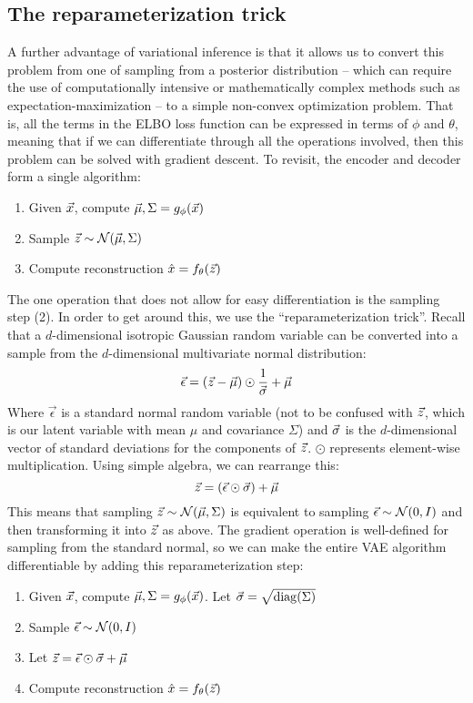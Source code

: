 \subsection{The reparameterization trick}

A further advantage of variational inference is that it allows us to convert this problem from one of sampling from a posterior distribution -- which can require the use of computationally intensive or mathematically complex methods such as expectation-maximization -- to a simple non-convex optimization problem. That is, all the terms in the ELBO loss function can be expressed in terms of $\phi$ and $\theta$, meaning that if we can differentiate through all the operations involved, then this problem can be solved with gradient descent. To revisit, the encoder and decoder form a single algorithm:
\begin{enumerate}
    \item Given $\vec{x}$, compute $\vec{\mu}, \Sigma = g_\phi(\vec{x})$
    \item Sample $\vec{z}\sim\mathcal{N}(\vec{\mu},\Sigma)$
    \item Compute reconstruction $\hat{x} = f_\theta(\vec{z})$
\end{enumerate}

The one operation that does not allow for easy differentiation is the sampling step (2). In order to get around this, we use the ``reparameterization trick''. Recall that a $d$-dimensional isotropic Gaussian random variable can be converted into a sample from the $d$-dimensional multivariate normal distribution:
\[
    \vec{\epsilon} = (\vec{z} - \vec{\mu}) \odot \frac{1}{\vec{\sigma}} + \vec{\mu}
\]
Where $\vec{\epsilon}$ is a standard normal random variable (not to be confused with $\vec{z}$, which is our latent variable with mean $\mu$ and covariance $\Sigma$) and $\vec{\sigma}$ is the $d$-dimensional vector of standard deviations for the components of $\vec{z}$. $\odot$ represents element-wise multiplication. Using simple algebra, we can rearrange this:
\[
    \vec{z} = (\vec{\epsilon} \odot \vec{\sigma}) + \vec{\mu}
\]
This means that sampling $\vec{z}\sim\mathcal{N}(\vec{\mu},\Sigma)$ is equivalent to sampling $\vec{\epsilon}\sim\mathcal{N}(0,I)$ and then transforming it into $\vec{z}$ as above. The gradient operation is well-defined for sampling from the standard normal, so we can make the entire VAE algorithm differentiable by adding this reparameterization step:

\begin{enumerate}
    \item Given $\vec{x}$, compute $\vec{\mu}, \Sigma = g_\phi(\vec{x})$. Let $\vec{\sigma} = \sqrt{\operatorname{diag}(\Sigma)}$
    \item Sample $\vec{\epsilon}\sim\mathcal{N}(0, I)$
    \item Let $\vec{z} = \vec{\epsilon}\odot\vec{\sigma} + \vec{\mu}$
    \item Compute reconstruction $\hat{x} = f_\theta(\vec{z})$
\end{enumerate}


